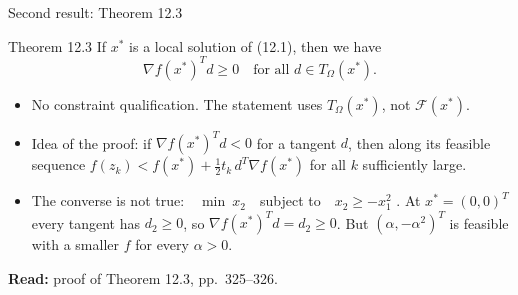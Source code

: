 \documentclass[aspectratio=169,12pt]{beamer}
\newcommand{\xs}{x^{*}}
\newcommand{\gradf}{\nabla f}
\newcommand{\eqn}[1]{\text{\small(#1)}}
\newcommand{\readbook}[1]{{\color{red}\textbf{Read:} #1}}
\newcommand{\cF}{\mathcal{F}}
\newcommand{\TO}{T_{\Omega}}
\begin{document}
\begin{frame}{Second result: Theorem 12.3}
  \begin{block}{Theorem 12.3}
    If $\xs$ is a local solution of (12.1), then we have
    \[ \gradf(\xs)^{T}d\ge 0\quad\text{for all } d\in\TO(\xs) . \tag{12.43} \]
  \end{block}
  \begin{itemize}\setlength\itemsep{0.35em}
    \item No constraint qualification. The statement uses $\TO(\xs)$, not $\cF(\xs)$.
    \item Idea of the proof: if $\gradf(\xs)^{T}d<0$ for a tangent $d$, then along its feasible sequence
      $f(z_{k})<f(\xs)+\tfrac12 t_{k}\,d^{T}\gradf(\xs)$ for all $k$ sufficiently large.
    \item The converse is not true:\ \ $\min\ x_{2}$\ \ subject to\ \ $x_{2}\ge -x_{1}^{2}$ \eqn{12.44}.
      At $\xs=(0,0)^{T}$ every tangent has $d_{2}\ge 0$, so $\gradf(\xs)^{T}d=d_{2}\ge 0$. But
      $(\alpha,-\alpha^{2})^{T}$ is feasible with a smaller $f$ for every $\alpha>0$.
  \end{itemize}
  \readbook{proof of Theorem 12.3, pp.~325--326.}
\end{frame}
\end{document}
